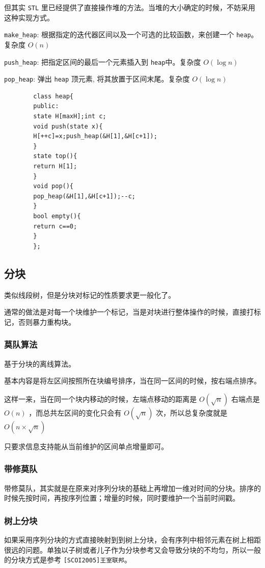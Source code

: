 \documentclass[UTF-8]{ctexart}
\begin{document}
		但其实 \texttt{STL} 里已经提供了直接操作堆的方法。当堆的大小确定的时候，不妨采用这种实现方式。
		
		\texttt{make\_heap}: 根据指定的迭代器区间以及一个可选的比较函数，来创建一个 \texttt{heap}。 复杂度 $O(n)$
		
		\texttt{push\_heap}: 把指定区间的最后一个元素插入到 \texttt{heap}中。复杂度 $O(\log n)$
		
		\texttt{pop\_heap}: 弹出 \texttt{heap} 顶元素, 将其放置于区间末尾。复杂度 $O(\log n)$
		
		\begin{verbatim}
		class heap{
		public:
		state H[maxH];int c;
		void push(state x){
		H[++c]=x;push_heap(&H[1],&H[c+1]);
		}
		state top(){
		return H[1];
		}
		void pop(){
		pop_heap(&H[1],&H[c+1]);--c;
		}
		bool empty(){
		return c==0;
		}
		};
		\end{verbatim}
		\subsection{分块}
类似线段树，但是分块对标记的性质要求更一般化了。

通常的做法是对每一个块维护一个标记，当是对块进行整体操作的时候，直接打标记，否则暴力重构块。
\subsubsection{莫队算法}
基于分块的离线算法。

基本内容是将左区间按照所在块编号排序，当在同一区间的时候，按右端点排序。

这样一来，当在同一个块内移动的时候，左端点移动的距离是 $O(\sqrt{n})$ 右端点是 $O(n)$ ，而总共左区间的变化只会有 $O(\sqrt{n})$ 次，所以总复杂度就是 $O(n \times \sqrt{n})$

只要求信息支持能从当前维护的区间单点增量即可。

\subsubsection{带修莫队}
带修莫队，其实就是在原来对序列分块的基础上再增加一维对时间的分块。排序的时候先按时间，再按序列位置；增量的时候，同时要维护一个当前时间戳。

\subsubsection{树上分块}
如果采用序列分块的方式直接映射到到树上分块，会有序列中相邻元素在树上相距很远的问题。单独以子树或者儿子作为分块参考又会导致分块的不均匀，所以一般的分块方式是参考 \texttt{[SCOI2005]王室联邦}。
\end{document}
